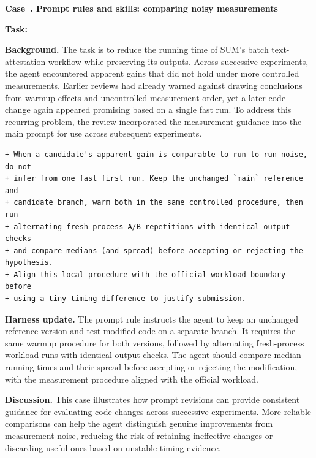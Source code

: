\par\medskip
{}
\label{case:prompt}
\noindent\textbf{Case~\theharnesscase. Prompt rules and skills: comparing noisy measurements}
\par\nopagebreak

\noindent\textbf{Task:} {\small{}}

\textbf{Background.}
The task is to reduce the running time of SUM's batch text-attestation workflow while preserving its outputs. Across successive experiments, the agent encountered apparent gains that did not hold under more controlled measurements. Earlier reviews had already warned against drawing conclusions from warmup effects and uncontrolled measurement order, yet a later code change again appeared promising based on a single fast run. To address this recurring problem, the review incorporated the measurement guidance into the main prompt for use across subsequent experiments.

\begin{lstlisting}[linebackgroundcolor={\DiffBackground{1,2,3,4,5,6,7}{}}]
+ When a candidate's apparent gain is comparable to run-to-run noise, do not
+ infer from one fast first run. Keep the unchanged `main` reference and
+ candidate branch, warm both in the same controlled procedure, then run
+ alternating fresh-process A/B repetitions with identical output checks
+ and compare medians (and spread) before accepting or rejecting the hypothesis.
+ Align this local procedure with the official workload boundary before
+ using a tiny timing difference to justify submission.
\end{lstlisting}

\textbf{Harness update.}
The prompt rule instructs the agent to keep an unchanged reference version and test modified code on a separate branch. It requires the same warmup procedure for both versions, followed by alternating fresh-process workload runs with identical output checks. The agent should compare median running times and their spread before accepting or rejecting the modification, with the measurement procedure aligned with the official workload.

\textbf{Discussion.}
This case illustrates how prompt revisions can provide consistent guidance for evaluating code changes across successive experiments. More reliable comparisons can help the agent distinguish genuine improvements from measurement noise, reducing the risk of retaining ineffective changes or discarding useful ones based on unstable timing evidence.

